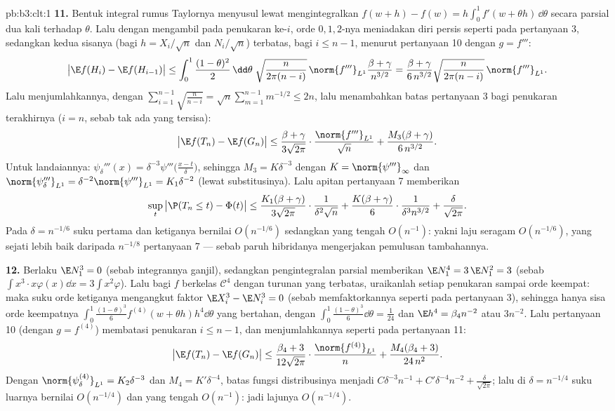 \begin{solution}{pb:b3:clt:1}
\textbf{11.} Bentuk integral rumus Taylornya menyusul
lewat mengintegralkan $f(w + h) - f(w) =
h\int_0^1f'(w + \theta h)\,\dd\theta$ secara parsial dua kali terhadap
$\theta$. Lalu dengan mengambil  pada penukaran ke-$i$,
orde $0, 1, 2$-nya meniadakan diri persis seperti pada pertanyaan 3, sedangkan
kedua sisanya (bagi $h = X_i/\sqrt n$
dan $N_i/\sqrt n$) terbatas, bagi $i \leq n - 1$, menurut
pertanyaan 10 dengan $g = f'''$:
\[
\bigl|\E f(H_i) - \E f(H_{i-1})\bigr| \leq
\int_0^1\frac{(1-\theta)^2}2\,\dd\theta\;
\sqrt{\frac{n}{2\pi(n-i)}}\,\norm{f'''}_{L^1}
\frac{\beta + \gamma}{n^{3/2}}
= \frac{\beta + \gamma}{6\,n^{3/2}}
\sqrt{\frac{n}{2\pi(n-i)}}\,\norm{f'''}_{L^1} .
\]
Lalu menjumlahkannya, dengan $\sum_{i=1}^{n-1}\sqrt{\frac n{n-i}} =
\sqrt n\sum_{m=1}^{n-1}m^{-1/2} \leq 2n$, lalu menambahkan
batas pertanyaan 3 bagi penukaran terakhirnya ($i = n$, sebab tak ada 
yang tersisa):
\[
\bigl|\E f(T_n) - \E f(G_n)\bigr| \leq
\frac{\beta + \gamma}{3\sqrt{2\pi}}\cdot
\frac{\norm{f'''}_{L^1}}{\sqrt n} +
\frac{M_3(\beta + \gamma)}{6\,n^{3/2}} .
\]
Untuk landaiannya: $\psi_\delta'''(x) =
\delta^{-3}\psi'''\bigl(\frac{x - t}\delta\bigr)$, sehingga
$M_3 = K\delta^{-3}$ dengan $K = \norm{\psi'''}_\infty$ dan
$\norm{\psi_\delta'''}_{L^1} = \delta^{-2}
\norm{\psi'''}_{L^1} = K_1\delta^{-2}$ (lewat substitusinya). Lalu
apitan pertanyaan 7 memberikan
\[
\sup_t\,\bigl|\P(T_n \leq t) - \Phi(t)\bigr| \leq
\frac{K_1(\beta + \gamma)}{3\sqrt{2\pi}}\cdot
\frac1{\delta^2\sqrt n} +
\frac{K(\beta + \gamma)}{6}\cdot
\frac1{\delta^3n^{3/2}} + \frac\delta{\sqrt{2\pi}} .
\]
Pada $\delta = n^{-1/6}$ suku pertama dan ketiganya bernilai
$O(n^{-1/6})$ sedangkan yang tengah $O(n^{-1})$: yakni laju
seragam $O(n^{-1/6})$, yang sejati lebih baik daripada $n^{-1/8}$
pertanyaan 7 --- sebab paruh  hibridanya mengerjakan
pemulusan tambahannya.

\textbf{12.} Berlaku $\E N_1^3 = 0$ (sebab integrannya ganjil), sedangkan
pengintegralan parsial memberikan $\E N_1^4 = 3\,\E N_1^2 = 3$
(sebab $\int x^3\cdot x\varphi(x)\dd x =
3\int x^2\varphi$). Lalu bagi $f$ berkelas $\mathcal C^4$ dengan
turunan yang terbatas, uraikanlah setiap penukaran sampai orde keempat: maka
suku orde ketiganya mengangkut faktor $\E X_i^3 - \E N_i^3 =
0$ (sebab  memfaktorkannya seperti pada pertanyaan 3), sehingga hanya
sisa orde keempatnya
$\int_0^1\frac{(1-\theta)^3}6f^{(4)}(w + \theta
h)h^4\dd\theta$ yang bertahan, dengan $\int_0^1
\frac{(1-\theta)^3}6\dd\theta = \frac1{24}$ dan $\E h^4 =
\beta_4n^{-2}$ atau $3n^{-2}$. Lalu pertanyaan 10 (dengan $g =
f^{(4)}$) membatasi penukaran $i \leq n - 1$, dan menjumlahkannya seperti
pada pertanyaan 11:
\[
\bigl|\E f(T_n) - \E f(G_n)\bigr| \leq
\frac{\beta_4 + 3}{12\sqrt{2\pi}}\cdot
\frac{\norm{f^{(4)}}_{L^1}}{n} +
\frac{M_4(\beta_4 + 3)}{24\,n^2} .
\]
Dengan $\norm{\psi_\delta^{(4)}}_{L^1} = K_2\delta^{-3}$ dan
$M_4 = K'\delta^{-4}$, batas fungsi distribusinya
menjadi $C\delta^{-3}n^{-1} + C'\delta^{-4}n^{-2} +
\frac\delta{\sqrt{2\pi}}$; lalu di $\delta = n^{-1/4}$ suku
luarnya bernilai $O(n^{-1/4})$ dan yang tengah $O(n^{-1})$:
jadi lajunya $O(n^{-1/4})$.


\end{solution}
